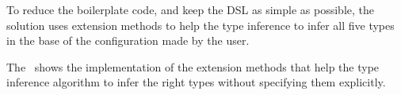 

To reduce the boilerplate code, and keep the DSL as simple as possible, the solution uses extension methods to help the type inference to infer
all five types in the base of the configuration made by the user.



The~ shows the implementation of the extension methods that help the type inference algorithm to infer the
right types without specifying them explicitly.
